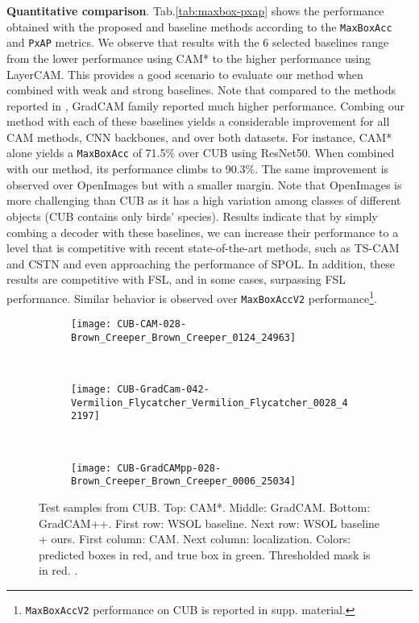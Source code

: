 \documentclass[twocolumn]{article}
\newcommand\maxboxacc{\texttt{MaxBoxAcc}\xspace}
\newcommand\newmaxboxacc{\texttt{MaxBoxAccV2}\xspace}
\newcommand\pxap{\texttt{PxAP}\xspace}
\theoremstyle{definition}
\begin{document}
\noindent \textbf{Quantitative comparison}. Tab.\ref{tab:maxbox-pxap} shows the performance obtained with the proposed and baseline methods according to the \maxboxacc and \pxap metrics. We observe that results with the 6 selected baselines range from the lower performance using CAM* to the higher performance using LayerCAM. This provides a good scenario to evaluate our method when combined with weak and strong baselines. Note that compared to the methods reported in \cite{choe2020evaluating}, GradCAM family reported much higher performance. Combing our method with each of these baselines yields a considerable improvement for all CAM methods, CNN backbones, and over both datasets. For instance, CAM* alone yields a \maxboxacc of 71.5\% over CUB using ResNet50. When combined with our method, its performance climbs to 90.3\%. The same improvement is observed over OpenImages but with a smaller margin. Note that OpenImages is more challenging than CUB as it has a high variation among classes of different objects (CUB contains only birds' species). Results indicate that by simply combing a decoder with these baselines, we can increase their performance to a level that is competitive with recent state-of-the-art methods, such as TS-CAM and CSTN and even approaching the performance of SPOL.  In addition, these results are competitive with FSL, and in some cases, surpassing FSL performance. Similar behavior is observed over \newmaxboxacc performance\footnote{\newmaxboxacc performance on CUB is reported in supp. material.}.

\begin{figure}
     \centering
     \begin{subfigure}[b]{0.45\textwidth}
         \centering
         \texttt{[image: CUB-CAM-028-Brown\_Creeper\_Brown\_Creeper\_0124\_24963]}
     \end{subfigure}
     \\
     \vspace{.2cm}
     \begin{subfigure}[b]{0.45\textwidth}
         \centering
         \texttt{[image: CUB-GradCam-042-Vermilion\_Flycatcher\_Vermilion\_Flycatcher\_0028\_42197]}
     \end{subfigure}
     \\
     \vspace{.2cm}
     \begin{subfigure}[b]{0.45\textwidth}
         \centering
         \texttt{[image: CUB-GradCAMpp-028-Brown\_Creeper\_Brown\_Creeper\_0006\_25034]}
     \end{subfigure}
        \caption{Test samples from CUB. Top: CAM*. Middle: GradCAM. Bottom: GradCAM++. First row: WSOL baseline. Next row: WSOL baseline + ours. First column: CAM. Next column: localization.
        Colors: predicted boxes in red, and true box in green. Thresholded mask is in red. .}
        \label{fig:mainvisucub}
\end{figure}
\end{document}
